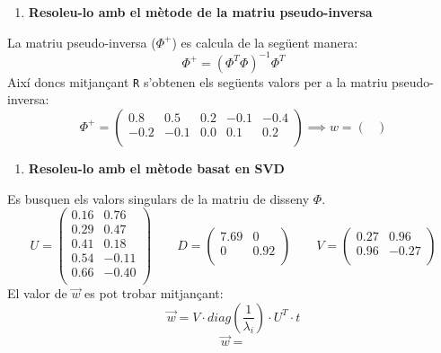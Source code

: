 \documentclass[a4paper]{article}
\begin{document}
\begin{enumerate}[resume]
	\item \textbf{Resoleu-lo amb el mètode de la matriu pseudo-inversa}
\end{enumerate}
La matriu pseudo-inversa ($\Phi^+$) es calcula de la següent manera:
$$
\Phi^+ = (\Phi^T\Phi)^{-1}\Phi^T
$$
Així doncs mitjançant \texttt{R} s'obtenen els següents valors per a la matriu pseudo-inversa:
$$
\Phi^+ =
\begin{pmatrix}
0.8 & 0.5 & 0.2 & -0.1 & -0.4\\
-0.2 & -0.1 & 0.0 & 0.1 & 0.2\\
\end{pmatrix}
\implies 
w = 
\begin{pmatrix}

\end{pmatrix}
$$

\begin{enumerate}[resume]
	\item \textbf{Resoleu-lo amb el mètode basat en SVD}
\end{enumerate}

Es busquen els valors singulars de la matriu de disseny $\Phi$.
$$
U = 
\begin{pmatrix}
0.16 & 0.76 \\
0.29 & 0.47 \\
0.41 & 0.18 \\
0.54 & -0.11 \\
0.66 & -0.40 \\
\end{pmatrix}
\qquad
D =
\begin{pmatrix}
7.69 & 0 \\
0 & 0.92 \\
\end{pmatrix}
\qquad
V = 
\begin{pmatrix}
0.27 & 0.96 \\
0.96 & -0.27 \\
\end{pmatrix}
$$
El valor de $\vec{w}$ es pot trobar mitjançant:
$$
\vec{w} = V·diag\left(\frac{1}{\lambda_i}\right)·U^T·t
$$
$$
\vec{w} = 
$$
\end{document}
